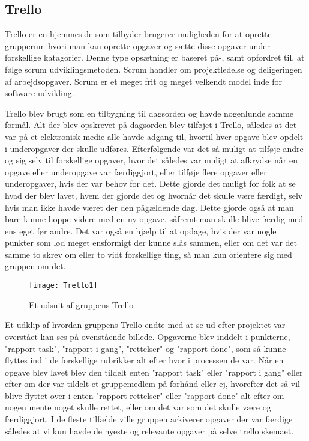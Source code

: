 \subsection{Trello}\label{Trello}
Trello er en hjemmeside som tilbyder brugerer muligheden for at oprette grupperum hvori man kan oprette opgaver og sætte disse opgaver under forskellige katagorier. Denne type opsætning er baseret på-, samt opfordret til, at følge scrum udviklingsmetoden. Scrum handler om projektledelse og deligeringen af arbejdsopgaver. Scrum er et meget frit og meget velkendt model inde for software udvikling.

Trello blev brugt som en tilbygning til dagsorden og havde nogenlunde samme formål. Alt der blev opskrevet på dagsorden blev tilføjet i Trello, således at det var på et elektronisk medie alle havde adgang til, hvortil hver opgave blev opdelt i underopgaver der skulle udføres. Efterfølgende var det så muligt at tilføje andre og sig selv til forskellige opgaver, hvor det således var muligt at afkrydse når en opgave eller underopgave var færdiggjort, eller tilføje flere  opgaver eller underopgaver, hvis der var behov for det. Dette gjorde det muligt for folk at se hvad der blev lavet, hvem der gjorde det og hvornår det skulle være færdigt, selv hvis man ikke havde været der den pågældende dag. Dette gjorde også at man bare kunne hoppe videre med en ny opgave, såfremt man skulle blive færdig med ens eget før andre. Det var også en hjælp til at opdage, hvis der var nogle punkter som lød meget ensformigt der kunne slås sammen, eller om det var det samme to skrev om eller to vidt forskellige ting, så man kun orientere sig med gruppen om det. 

\begin{figure}[h]
\texttt{[image: Trello1]}
\centering
\caption{Et udsnit af gruppens Trello}\label{Gantt-diagram-picture}
\end{figure}

Et udklip af hvordan gruppens Trello endte med at se ud efter projektet var overstået kan ses på ovenstående billede. Opgaverne blev inddelt i punkterne, "rapport task", "rapport i gang", "rettelser" og "rapport done", som så kunne flyttes ind i de forskellige rubrikker alt efter hvor i processen de var. Når en opgave blev lavet blev den tildelt enten "rapport task" eller "rapport i gang" eller efter om der var tildelt et gruppemedlem på forhånd eller ej, hvorefter det så vil blive flyttet over i enten "rapport rettelser" eller "rapport done" alt efter om nogen mente noget skulle rettet, eller om det var som det skulle være og færdiggjort. I de fleste tilfælde ville gruppen arkiverer opgaver der var færdige således at vi kun havde de nyeste og relevante opgaver på selve trello skemaet.

